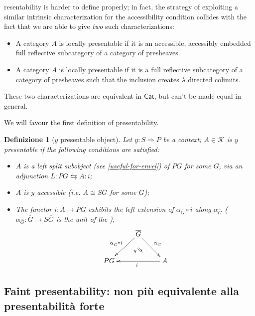 \documentclass[11pt]{article}
\def\Cat{\mathsf{Cat}}
\def\To{\Rightarrow}
\newcommand{\Searrow}{\rotatebox[origin=c]{-45}{$\Rightarrow$}} %
\theoremstyle{reference}
\newtheorem{definition}[theorem]{Definizione}
\begin{document}
resentability is harder to define properly; in fact, the strategy of exploiting a similar intrinsic characterization for the accessibility condition collides with the fact that we are able to give \emph{two} such characterizations:
\begin{itemize}
	\item \label{llp:uno} A category $A$ is locally presentable if it is an accessible, accessibly embedded full reflective subcategory of a category of presheaves.
	\item \label{llp:due} A category $A$ is locally presentable if it is a full reflective subcategory of a category of presheaves such that the inclusion creates $\lambda$ directed colimits.
\end{itemize}
These two characterizations are equivalent in \(\Cat\), but can't be made equal in general.

We will favour the first definition of presentability.
\begin{definition}[$y$ presentable object]\label{yonpres}
	Let $y : S \To P$ be a context; $A\in\mathcal K$ is $y$ \emph{presentable} if the following conditions are satisfied:
	\begin{itemize}
		\item \label{p:uno} $A$ is a left split subobject (see \autoref{useful-for-envel}) of $ P G$ for some $G$, via an adjunction $L :  P G \leftrightarrows A : i$;
		\item \label{p:due} $A$ is $y$ accessible (i.e. $A\cong S \overline G$ for some $\overline G$);
		\item \label{p:tre} The functor $i : A\to  P G$ exhibits the left extension of $\alpha_{\overline G}\circ i$ along $\alpha_{\overline G}$ ($\alpha_{\overline G} : \overline G \to S \overline G$ is the unit of the \kz),
		\[
			\vcenter{\xymatrix{
			&\overline G \ar@{}[d]|(.6){\eta\Searrow} \ar[dr]^{\alpha_{\bar G}} \ar[dl]_{\alpha_{\bar G}\circ i}& \\
			 P G && \ar[ll]^i A
			}}
		\]
	\end{itemize}
\end{definition}

\subsection{Faint presentability: non più equivalente alla presentabilità forte}
\label{sec:orgd3d6c82}
\end{document}
